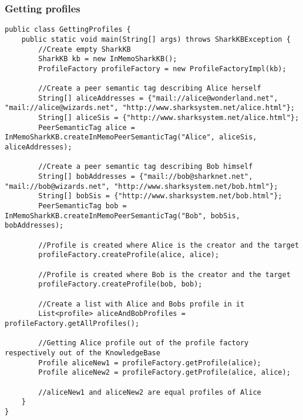 \subsubsection{Getting profiles}
\begin{verbatim}
public class GettingProfiles {
    public static void main(String[] args) throws SharkKBException {
    	//Create empty SharkKB
    	SharkKB kb = new InMemoSharkKB();
    	ProfileFactory profileFactory = new ProfileFactoryImpl(kb);
    	
    	//Create a peer semantic tag describing Alice herself
    	String[] aliceAddresses = {"mail://alice@wonderland.net", "mail://alice@wizards.net", "http://www.sharksystem.net/alice.html"};
    	String[] aliceSis = {"http://www.sharksystem.net/alice.html"};
    	PeerSemanticTag alice = InMemoSharkKB.createInMemoPeerSemanticTag("Alice", aliceSis, aliceAddresses);
    	
    	//Create a peer semantic tag describing Bob himself
    	String[] bobAddresses = {"mail://bob@sharknet.net", "mail://bob@wizards.net", "http://www.sharksystem.net/bob.html"};
    	String[] bobSis = {"http://www.sharksystem.net/bob.html"};
    	PeerSemanticTag bob = InMemoSharkKB.createInMemoPeerSemanticTag("Bob", bobSis, bobAddresses);
    	
    	//Profile is created where Alice is the creator and the target
    	profileFactory.createProfile(alice, alice);
    	
    	//Profile is created where Bob is the creator and the target
    	profileFactory.createProfile(bob, bob);
    	
    	//Create a list with Alice and Bobs profile in it
		List<profile> aliceAndBobProfiles = profileFactory.getAllProfiles();  	
		
		//Getting Alice profile out of the profile factory respectively out of the KnowledgeBase
		Profile aliceNew1 = profileFactory.getProfile(alice);
		Profile aliceNew2 = profileFactory.getProfile(alice, alice);
		
		//aliceNew1 and aliceNew2 are equal profiles of Alice
    }
}
\end{verbatim}



















































